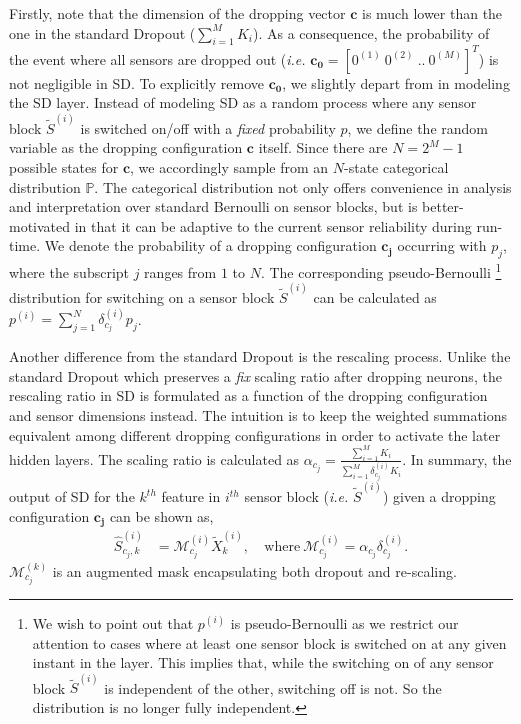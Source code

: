 \documentclass[../thesis.tex]{subfiles}
\begin{document}
Firstly, note that the dimension of the dropping vector $\mathbf{c}$ is much lower than the one in the standard Dropout ($\sum_{i=1}^M K_i$). As a consequence, the probability of the event where all sensors are dropped out (\textit{i.e.} $\mathbf{{c_0}} = [0^{(1)}~0^{(2)}~..~0^{(M)}]^T$) is not negligible in SD. To explicitly remove $\mathbf{{c_0}}$, we slightly depart from \cite{dropout} in modeling the SD layer. Instead of modeling SD as a random process where any sensor block $\tilde{S}^{(i)}$ is switched on/off with a \textit{fixed} probability $p$, we define the random variable as the dropping configuration $\mathbf{c}$ itself. Since there are $N = 2^M - 1$ possible states for $\mathbf{c}$, we accordingly sample from an $N$-state categorical distribution $\mathbb{P}$. The categorical distribution not only offers convenience in analysis and interpretation over standard Bernoulli on sensor blocks, but is better-motivated in that it can be adaptive to the current sensor reliability during run-time. We denote the probability of a dropping configuration $\mathbf{{c_j}}$ occurring with $p_j$, where the subscript $j$ ranges from $1$ to $N$. The corresponding pseudo-Bernoulli
\footnote{
We wish to point out that $p^{(i)}$ is pseudo-Bernoulli as we restrict our attention to cases where at least one sensor block is switched on at any given instant in the layer. This implies that, while the switching on of any sensor block $\tilde{S}^{(i)}$ is independent of the other, switching off is not. So the distribution is no longer fully independent.
}
distribution for switching on a sensor block $\tilde{S}^{(i)}$ can be calculated as $p^{(i)} = \sum_{j=1}^N\delta_{c_j}^{(i)} p_j$.
 
 
Another difference from the standard Dropout is the rescaling process. Unlike the standard Dropout which preserves a \textit{fix} scaling ratio after dropping neurons, the rescaling ratio in SD is formulated as a function of the dropping configuration and sensor dimensions instead. The intuition is to keep the weighted summations equivalent among different dropping configurations in order to activate the later hidden layers. The scaling ratio is calculated as $\alpha_{c_j} = \frac{\sum_{i=1}^M K_i }{\sum_{i=1}^M \delta_{c_j}^{(i)} K_i}.$ In summary, the output of SD for the $k^{th}$ feature in $i^{th}$ sensor block (\textit{i.e.} $\tilde{S}^{(i)}$) given a dropping configuration $\mathbf{c_j}$ can be shown as,
\begin{align}
\hat{S}^{(i)}_{{c_j},k} &= \mathcal{M}^{(i)}_{c_j} \tilde{X}_k^{(i)}, \
&\text{where} \ \mathcal{M}^{(i)}_{c_j} = \alpha_{c_j} \delta_{c_j}^{(i)}.
\end{align}
$\mathcal{M}^{(k)}_{c_j}$ is an augmented mask encapsulating both dropout and re-scaling.
 
\end{document}
